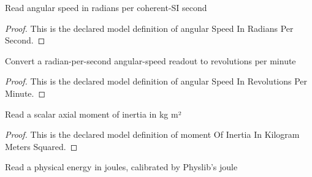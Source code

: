 \begin{definition}
  \label{def:physics:phyx-mini-0698:phyxminiproblems-problemphyxmini0698-angularspeedinradianspersecond}
  Read angular speed in radians per coherent-SI second
\end{definition}
\begin{proof}
  This is the declared model definition of angular Speed In Radians Per Second.
\end{proof}
\begin{definition}
  \label{def:physics:phyx-mini-0698:phyxminiproblems-problemphyxmini0698-angularspeedinrevolutionsperminute}
  Convert a radian-per-second angular-speed readout to revolutions per minute
\end{definition}
\begin{proof}
  This is the declared model definition of angular Speed In Revolutions Per Minute.
\end{proof}
\begin{definition}
  \label{def:physics:phyx-mini-0698:phyxminiproblems-problemphyxmini0698-momentofinertiainkilogrammeterssquared}
  Read a scalar axial moment of inertia in kg m²
\end{definition}
\begin{proof}
  This is the declared model definition of moment Of Inertia In Kilogram Meters Squared.
\end{proof}
\begin{definition}
  \label{def:physics:phyx-mini-0698:phyxminiproblems-problemphyxmini0698-energyinjoules}
  Read a physical energy in joules, calibrated by Physlib's joule
\end{definition}
